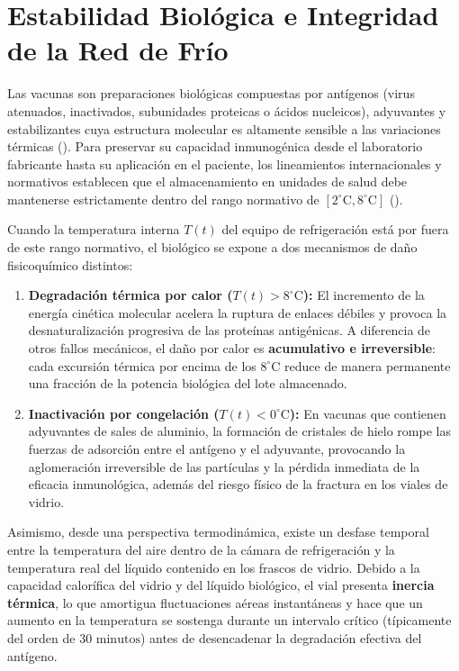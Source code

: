 \documentclass[
  spanish,
  us-letterpaper,
]{scrreprt}
\providecommand{\tightlist}{%
  \setlength{\itemsep}{0pt}\setlength{\parskip}{0pt}}
\numberwithin{equation}{section}
\theoremstyle{plain}
\theoremstyle{plain}
\theoremstyle{plain}
\theoremstyle{definition}
\theoremstyle{remark}
\begin{document}
\section{Estabilidad Biológica e Integridad de la Red de
Frío}\label{estabilidad-bioluxf3gica-e-integridad-de-la-red-de-fruxedo}

Las vacunas son preparaciones biológicas compuestas por antígenos (virus
atenuados, inactivados, subunidades proteicas o ácidos nucleicos),
adyuvantes y estabilizantes cuya estructura molecular es altamente
sensible a las variaciones térmicas
(). Para
preservar su capacidad inmunogénica desde el laboratorio fabricante
hasta su aplicación en el paciente, los lineamientos internacionales y
normativos establecen que el almacenamiento en unidades de salud debe
mantenerse estrictamente dentro del rango normativo de
\([2^\circ\text{C}, 8^\circ\text{C}]\)
().

Cuando la temperatura interna \(T(t)\) del equipo de refrigeración está
por fuera de este rango normativo, el biológico se expone a dos
mecanismos de daño fisicoquímico distintos:

\begin{enumerate}
\def\labelenumi{\arabic{enumi}.}
\tightlist
\item
  \textbf{Degradación térmica por calor (\(T(t) > 8^\circ\text{C}\)):}
  El incremento de la energía cinética molecular acelera la ruptura de
  enlaces débiles y provoca la desnaturalización progresiva de las
  proteínas antigénicas. A diferencia de otros fallos mecánicos, el daño
  por calor es \textbf{acumulativo e irreversible}: cada excursión
  térmica por encima de los \(8^\circ\text{C}\) reduce de manera
  permanente una fracción de la potencia biológica del lote almacenado.
\item
  \textbf{Inactivación por congelación (\(T(t) < 0^\circ\text{C}\)):} En
  vacunas que contienen adyuvantes de sales de aluminio, la formación de
  cristales de hielo rompe las fuerzas de adsorción entre el antígeno y
  el adyuvante, provocando la aglomeración irreversible de las
  partículas y la pérdida inmediata de la eficacia inmunológica, además
  del riesgo físico de la fractura en los viales de vidrio.
\end{enumerate}

Asimismo, desde una perspectiva termodinámica, existe un desfase
temporal entre la temperatura del aire dentro de la cámara de
refrigeración y la temperatura real del líquido contenido en los frascos
de vidrio. Debido a la capacidad calorífica del vidrio y del líquido
biológico, el vial presenta \textbf{inercia térmica}, lo que amortigua
fluctuaciones aéreas instantáneas y hace que un aumento en la
temperatura se sostenga durante un intervalo crítico (típicamente del
orden de \(30\text{ minutos}\)) antes de desencadenar la degradación
efectiva del antígeno.
\end{document}
